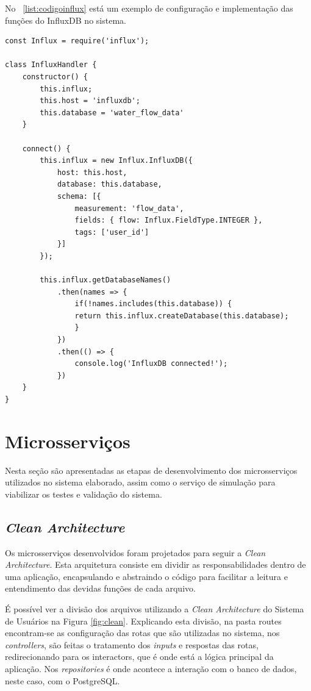 No \lstlistingname\ \ref{list:codigoinflux} está um exemplo de configuração e implementação das funções do InfluxDB no sistema.

\newpage


\begin{lstlisting}[label=list:codigoinflux, caption=Exemplo do código de configuração do InfluxDB]
const Influx = require('influx');

class InfluxHandler {
	constructor() {
		this.influx;
		this.host = 'influxdb';
		this.database = 'water_flow_data'
	}
	
	connect() {
		this.influx = new Influx.InfluxDB({
			host: this.host,
			database: this.database,
			schema: [{
				measurement: 'flow_data',
				fields: { flow: Influx.FieldType.INTEGER },
				tags: ['user_id']
			}]
		});
		
		this.influx.getDatabaseNames()
			.then(names => {
				if(!names.includes(this.database)) {
				return this.influx.createDatabase(this.database);
				}
			})
			.then(() => {
				console.log('InfluxDB connected!');
			})
	}
}
\end{lstlisting}

\section{Microsserviços}

Nesta seção são apresentadas as etapas de desenvolvimento dos microsserviços utilizados no sistema elaborado, assim como o serviço de simulação para viabilizar os testes e validação do sistema.

\subsection{\textit{Clean Architecture}}

Os microsserviços desenvolvidos foram projetados para seguir a \textit{Clean Architecture}. Esta arquitetura consiste em dividir as responsabilidades dentro de uma aplicação, encapsulando e abstraindo o código para facilitar a leitura e entendimento das devidas funções de cada arquivo.

É possível ver a divisão dos arquivos utilizando a \textit{Clean Architecture} do Sistema de Usuários na Figura \ref{fig:clean}. Explicando esta divisão, na pasta routes encontram-se as configuração das rotas que são utilizadas no sistema, nos \textit{controllers}, são feitas o tratamento dos \textit{inputs} e respostas das rotas, redirecionando para os interactors, que é onde está a lógica principal da aplicação. Nos \textit{repositories} é onde acontece a interação com o banco de dados, neste caso, com o PostgreSQL.

